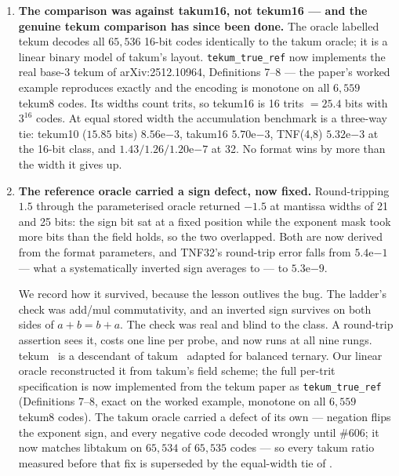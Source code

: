 \begin{enumerate}[leftmargin=*]
\item \textbf{The comparison was against takum16, not tekum16 --- and the
genuine tekum comparison has since been done.} The oracle labelled tekum
decodes all $65{,}536$ 16-bit codes identically to the takum oracle; it is a
linear binary model of takum's layout. \texttt{tekum\_true\_ref} now
implements the real base-3 tekum of arXiv:2512.10964, Definitions 7--8 --- the
paper's worked example reproduces exactly and the encoding is monotone on all
$6{,}559$ tekum8 codes. Its widths count trits, so tekum16 is 16 trits
$= 25.4$ bits with $3^{16}$ codes. At equal stored width the accumulation
benchmark is a three-way tie: tekum10 ($15.85$ bits) $8.56\mathrm{e}{-3}$,
takum16 $5.70\mathrm{e}{-3}$, TNF(4,8) $5.32\mathrm{e}{-3}$ at the 16-bit
class, and $1.43/1.26/1.20\mathrm{e}{-7}$ at 32. No format wins by more than
the width it gives up.

\item \textbf{The reference oracle carried a sign defect, now fixed.} Round-tripping
$1.5$ through the parameterised oracle returned $-1.5$ at mantissa widths of 21
and 25 bits: the sign bit sat at a fixed position while the exponent mask took
more bits than the field holds, so the two overlapped. Both are now derived from
the format parameters, and TNF32's round-trip error falls from
$5.4\mathrm{e}{-1}$ --- what a systematically inverted sign averages to --- to
$5.3\mathrm{e}{-9}$.

We record how it survived, because the lesson outlives the bug. The ladder's
check was add/mul commutativity, and an inverted sign survives on both sides of
$a+b=b+a$. The check was real and blind to the class. A round-trip assertion sees
it, costs one line per probe, and now runs at all nine rungs. tekum~\cite{tekum} is a descendant of takum~\cite{takum} adapted for balanced
ternary. Our
linear oracle reconstructed it from takum's field scheme; the full per-trit
specification is now implemented from the tekum paper as
\texttt{tekum\_true\_ref} (Definitions 7--8, exact on the worked example,
monotone on all $6{,}559$ tekum8 codes). The takum oracle carried a defect of
its own --- negation flips the exponent sign, and every negative code decoded
wrongly until \#606; it now matches libtakum on $65{,}534$ of $65{,}535$ codes
--- so every takum ratio measured before that fix is superseded by the
equal-width tie of .


\end{enumerate}
